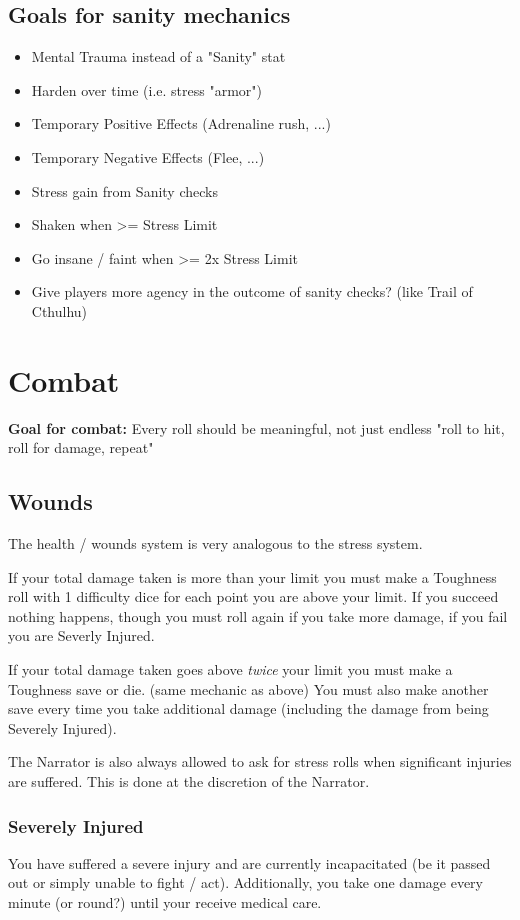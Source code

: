 \section*{Goals for sanity mechanics}
\begin{itemize}
    \item Mental Trauma instead of a "Sanity" stat
    \item Harden over time (i.e. stress "armor")
    \item Temporary Positive Effects (Adrenaline rush, ...)
    \item Temporary Negative Effects (Flee, ...)
    \item Stress gain from Sanity checks
    \item Shaken when >= Stress Limit
    \item Go insane / faint when >= 2x Stress Limit
    \item Give players more agency in the outcome of sanity checks? (like Trail of Cthulhu)
\end{itemize}


\chapter{Combat}

\textbf{Goal for combat:} Every roll should be meaningful, not just endless "roll to hit, roll for damage, repeat" 

\section{Wounds}
The health / wounds system is very analogous to the stress system.

If your total damage taken is more than your limit you must make a Toughness roll with 1 difficulty dice for each point you are above your limit.  
If you succeed nothing happens, though you must roll again if you take more damage, if you fail you are Severly Injured.

If your total damage taken goes above \textit{twice} your limit you must make a Toughness save or die. (same mechanic as above)  
You must also make another save every time you take additional damage (including the damage from being Severely Injured).

The Narrator is also always allowed to ask for stress rolls when significant injuries are suffered. 
This is done at the discretion of the Narrator.


\subsection{Severely Injured}
You have suffered a severe injury and are currently incapacitated (be it passed out or simply unable to fight / act).
Additionally, you take one damage every minute (or round?) until your receive medical care.


